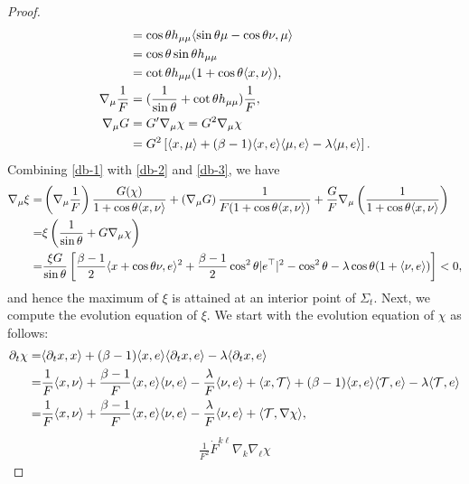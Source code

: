 \documentclass[10pt,a4paper]{amsart}
\begin{document}
\begin{proof}
\begin{align}
	&=\cos\theta h_{\mu\mu}\langle \sin\theta\mu-\cos\theta\nu,\mu \rangle\notag\\
	&=\cos\theta\sin\theta h_{\mu\mu}\notag\\
	&=\cot\theta h_{\mu\mu}(1+\cos\theta\langle x,\nu \rangle),\label{db-1}\\
	\nabla_{\mu}{\frac{1}{F}}&=(\frac{1}{\sin\theta}+\cot\theta h_{\mu\mu})\frac{1}{F},\label{db-2}\\
	\nabla_{\mu}{G}&=G'\nabla_{\mu}{\chi}=G^2\nabla_{\mu}{\chi}\notag\\
	&=G^2\left[\langle x,\mu\rangle+(\beta-1)\langle x,e\rangle\langle \mu,e\rangle-\lambda\langle\mu,e\rangle\right].\label{db-3}
\end{align}
Combining \eqref{db-1} with \eqref{db-2} and \eqref{db-3}, we have
\begin{align}
	\nabla_{\mu}{\xi}
	=&\left(\nabla_{\mu}{\frac{1}{F}}\right)\frac{G(\chi)}{1+\cos\theta\langle x,\nu \rangle}+\left(\nabla_{\mu}G\right)\frac{1}{F(1+\cos\theta\langle x,\nu \rangle)}+\frac{G}{F}\nabla_{\mu}\left(\frac{1}{1+\cos\theta\langle x,\nu \rangle}\right)\notag\\
	=&\xi\left(\frac{1}{\sin\theta}+G\nabla_{\mu}{\chi}\right)\notag\\
	=&\frac{\xi G}{\sin\theta}\left[\frac{\beta-1}{2}\langle x+\cos\theta\nu,e\rangle^2+\frac{\beta-1}{2}\cos^2{\theta}|e^{\top}|^2-\cos^2\theta-\lambda\cos\theta(1+\langle\nu,e\rangle)\right]<0,\label{boundary-xi}
\end{align}
and hence the maximum of $\xi$ is attained at an interior point of $\Sigma_t$. Next, we compute the evolution equation of $\xi$. We start with the evolution equation of $\chi$ as follows:
\begin{align}
	\partial_t\chi=&\langle\partial_t{x},x\rangle+(\beta-1)\langle x,e\rangle\langle\partial_t{x},e\rangle-\lambda\langle \partial_t{x},e\rangle\notag\\
	=&\frac{1}{F}\langle x,\nu\rangle+\frac{\beta-1}{F}\langle x,e\rangle\langle\nu,e\rangle-\frac{\lambda}{F}\langle\nu,e\rangle+\langle x,\mathcal{T}\rangle+(\beta-1)\langle x,e\rangle\langle \mathcal{T},e\rangle-\lambda\langle \mathcal{T},e\rangle\notag\\
	=&\frac{1}{F}\langle x,\nu\rangle+\frac{\beta-1}{F}\langle x,e\rangle\langle\nu,e\rangle-\frac{\lambda}{F}\langle\nu,e\rangle+\langle \mathcal{T},\nabla\chi \rangle, \label{partial-chi}
\end{align}
\begin{align}
		\frac{1}{F^2}\dot{F}^{k\ell}\nabla_k\nabla_{\ell}{\chi}

\end{align}
\end{proof}
\end{document}

